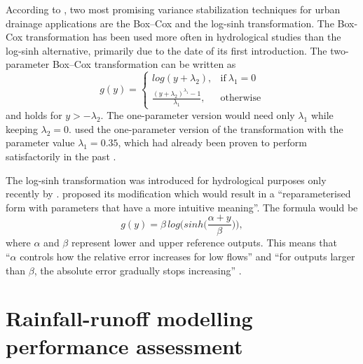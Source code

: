 \documentclass{ctuthesis}\usepackage[]{graphicx}\usepackage[]{color}
\begin{document}
According to \cite{giudice2013improving},  two most promising variance stabilization techniques for urban drainage
applications are the Box–Cox \citep{box1964analysis}  and the log-sinh \citep{wang2012log} transformation. The Box-Cox transformation has been used more often in hydrological studies  than the log-sinh alternative, primarily due to the date of its first introduction. The two-parameter Box–Cox transformation can be written as
\begin{equation}
 g(y)=
    \begin{cases}
      log(y+\lambda_2) , & \text{if}\ \lambda_1=0 \\
      \frac{(y+\lambda_2)^{\lambda_1}-1}{\lambda_1} , & \text{otherwise}
    \end{cases}
\end{equation}
and holds for $y > -\lambda_2$. The one-parameter version would need only  $\lambda_1$  while keeping $\lambda_2 = 0$. \cite{giudice2013improving} used the one-parameter version of the transformation with the parameter value $\lambda_1=0.35$, which had already been proven to perform satisfactorily in the past \citep[e.g.][]{honti2013integrated, wang2012log}.

The log-sinh transformation was introduced for hydrological purposes only recently by \cite{wang2012log}. \cite{giudice2013improving}  proposed its modification which would result in a \enquote{reparameterised form with parameters that have a more intuitive meaning}. The formula would be
\begin{equation}
g(y)= \beta \, log \Big(sinh \big( \frac{\alpha+y}{\beta} \big) \Big),
\end{equation}
where $\alpha$ and $\beta$ represent lower and upper reference outputs. This means that \\ \enquote{$\alpha$ controls how the relative error increases for low flows} and \enquote{for outputs larger than $\beta$, the absolute error gradually stops increasing} \citep{giudice2013improving}.



\section{Rainfall-runoff modelling performance assessment} \label{PerAsses} 
\end{document}
